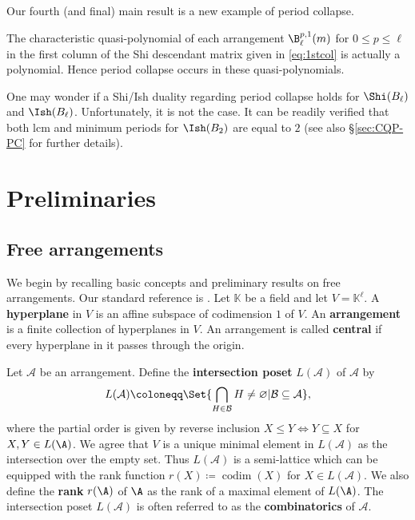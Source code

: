 Our fourth (and final) main result is a new example of period collapse.
\begin{theorem}
 \label{thm:1stcol-PC-intro}
The characteristic quasi-polynomial of each arrangement $\B^{p,1}_\ell(m)$ for $0 \le p \le \ell$ in the first column of the Shi descendant matrix given in \eqref{eq:1stcol} is actually a polynomial. 
Hence period collapse occurs in these quasi-polynomials. 
 \end{theorem} 

One may wonder if a Shi/Ish duality regarding period collapse holds for $\Shi(B_{\ell})$ and $\Ish(B_{\ell})$. 
Unfortunately, it is not the case. 
It can be readily verified that both lcm and minimum periods for $\Ish(B_{2})$ are equal to $2$ (see also \S\ref{sec:CQP-PC} for further details).

\section{Preliminaries}
\label{sec:free-arr}

\subsection{Free arrangements}
\label{subsec:free}
We begin by recalling basic concepts and preliminary results on free arrangements. Our standard reference is \cite{OT92}.
Let $ \mathbb{K} $ be a field and let $V=  \mathbb{K}^{\ell} $. 
A \textbf{hyperplane} in $V$ is an affine subspace of codimension $1$ of $V$.
An \textbf{arrangement} is a finite collection of hyperplanes in  $ V $. 
An arrangement is called \textbf{central} if every hyperplane in it passes through the origin. 

Let  $ \mathcal{A} $ be an arrangement.
Define the \textbf{intersection poset} $ L(\mathcal{A}) $ of $ \mathcal{A} $ by 
\begin{align*}
L(\mathcal{A})  \coloneqq \Set{\bigcap_{H \in \mathcal{B}}H \neq \varnothing |  \mathcal{B} \subseteq \mathcal{A} },
\end{align*}
where the partial order is given by reverse inclusion $X\le Y\Leftrightarrow Y\subseteq X$ for $X, Y \in L(\A)$. 
We agree that $ V $ is a unique minimal element in $ L(\mathcal{A}) $ as the intersection over the empty set. 
Thus $ L(\mathcal{A}) $ is a semi-lattice which can be equipped with the rank function $ r(X)  \coloneqq \operatorname{codim}(X) $ for $X \in L(\mathcal{A})$. 
We also define the \textbf{rank} $r(\A)$ of $\A$ as the rank of a maximal element of $L(\A)$.
The intersection poset $ L(\mathcal{A}) $ is often referred to as the  \textbf{combinatorics} of  $ \mathcal{A} $. 

